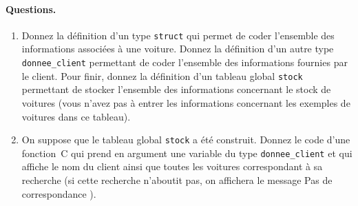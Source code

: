 \paragraph{Questions.}
\begin{enumerate}
\item Donnez la  d\'efinition d'un type  \texttt{struct} qui permet de
  coder l'ensemble   des  informations associ\'ees  \`a  une voiture.  
  Donnez  la  d\'efinition d'un   autre type   \texttt{donnee\_client}
  permettant  de coder  l'ensemble  des informations  fournies par  le
  client.   Pour finir, donnez   la  d\'efinition d'un tableau  global
  \texttt{stock} permettant  de  stocker  l'ensemble  des informations
  concernant le  stock de voitures  (vous  n'avez pas \`a  entrer  les
  informations concernant les exemples de voitures dans ce tableau).
\item On    suppose que le   tableau  global \texttt{stock}  a \'et\'e
  construit. Donnez le code d'une fonction~C qui prend en argument une
  variable du  type \texttt{donnee\_client} et  qui  affiche le nom du
  client ainsi que toutes  les voitures correspondant \`a sa recherche
  (si cette recherche n'aboutit pas, on affichera le message \og Pas de
  correspondance \fg).
\end{enumerate}
